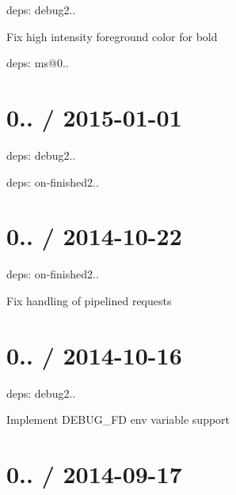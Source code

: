 
\begin{DoxyItemize}
\item deps\+: debug2..
\begin{DoxyItemize}
\item Fix high intensity foreground color for bold
\item deps\+: ms@0..
\end{DoxyItemize}
\end{DoxyItemize}

\section*{0.. / 2015-\/01-\/01 }


\begin{DoxyItemize}
\item deps\+: debug2..
\item deps\+: on-\/finished2..
\end{DoxyItemize}

\section*{0.. / 2014-\/10-\/22 }


\begin{DoxyItemize}
\item deps\+: on-\/finished2..
\begin{DoxyItemize}
\item Fix handling of pipelined requests
\end{DoxyItemize}
\end{DoxyItemize}

\section*{0.. / 2014-\/10-\/16 }


\begin{DoxyItemize}
\item deps\+: debug2..
\begin{DoxyItemize}
\item Implement {\ttfamily D\+E\+B\+U\+G\+\_\+\+F\+D} env variable support
\end{DoxyItemize}
\end{DoxyItemize}

\section*{0.. / 2014-\/09-\/17 }


